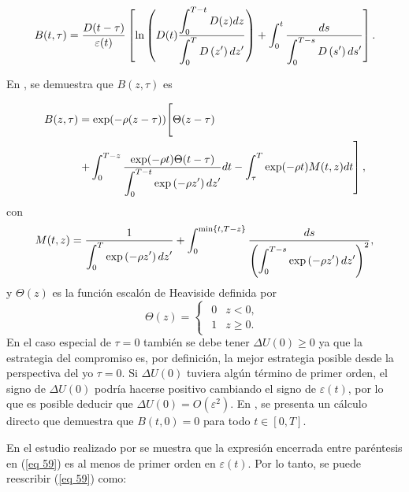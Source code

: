 $$B(t,\tau)=\dfrac{D(t-\tau)}{\varepsilon(t)}\left[\ln \left(D(t) \dfrac{\displaystyle \int_0^{T-t} D(z) d z}{\displaystyle \int_0^T D\left(z^{\prime}\right) d z^{\prime}}\right)+\displaystyle \int_0^t \dfrac{d s}{\displaystyle \int_0^{T-s} D\left(s^{\prime}\right) d s^{\prime}}\right].$$

En \parencite{feigenbaum2021deviation}, se demuestra que $B(z, \tau)$ es


\begin{equation}
\label{eq 61}
\begin{aligned}
B(z, \tau) & =\exp (-\rho(z-\tau))\Biggr[\Theta(z-\tau) \\
& \left.+\displaystyle \int_0^{T-z} \dfrac{\exp (-\rho t) \Theta(t-\tau)}{\displaystyle \int_0^{T-t} \exp \left(-\rho z^{\prime}\right) d z^{\prime}} d t-\displaystyle \int_\tau^T \exp (-\rho t) M(t, z) d t\right],
\end{aligned}
\end{equation}
%
\noindent con
\begin{equation}
\label{eq 62}
M(t, z)=\dfrac{1}{\displaystyle \int_0^T \exp \left(-\rho z^{\prime}\right) d z^{\prime}}+\displaystyle \int_0^{\min \{t, T-z\}} \dfrac{d s}{\left(\displaystyle \int_0^{T-s} \exp \left(-\rho z^{\prime}\right) d z^{\prime}\right)^2},
\end{equation}
%
\noindent y $\Theta(z)$ es la función escalón de Heaviside definida por 
%
\begin{equation}
\label{eq 63}
    \Theta(z)=   \begin{cases} \begin{matrix} 0 & z<0, \\ 1 & z \geq 0.  \end{matrix}  \end{cases}
\end{equation}
%
En el caso especial de $\tau = 0$ también se debe tener $\Delta U(0) \geq 0$ ya que la estrategia del compromiso es, por definición, la mejor estrategia posible desde la perspectiva del yo $\tau = 0$. Si $\Delta U(0)$ tuviera algún término de primer orden, el signo de $\Delta U(0)$ podría hacerse positivo cambiando el signo de $\varepsilon (t)$, por lo que es posible deducir que $\Delta U(0) = O(\varepsilon^2)$. En \parencite{feigenbaum2021deviation}, se presenta un cálculo directo que demuestra que $B(t, 0) = 0$ para todo $t \in [0, T]$.

En el estudio realizado por \textcite{feigenbaum2021deviation} se muestra que la expresión encerrada entre paréntesis en (\ref{eq 59}) es al menos de primer orden en $\varepsilon(t)$. Por lo tanto, se puede reescribir (\ref{eq 59}) como:

